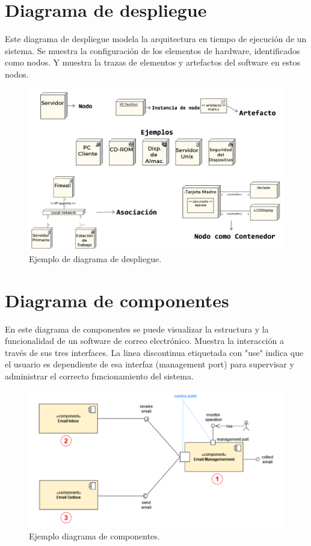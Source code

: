 \documentclass[a4paper, 12pt]{book}
\begin{document}
\section{Diagrama de despliegue}
Este diagrama de despliegue modela la arquitectura en tiempo de ejecución de un sistema. Se muestra la configuración de los elementos de hardware, identificados como nodos. Y muestra la trazas de elementos y artefactos del software en estos nodos. 
\begin{figure}
	\centering
	\includegraphics[width=16cm, keepaspectratio]{img/diagrama_despliegue.png}
	\caption{Ejemplo de diagrama de despliegue.}\label{fig:diagrama_despliegue}
\end{figure}

\section{Diagrama de componentes}
En este diagrama de componentes se puede visualizar la estructura y la funcionalidad de un software de correo electrónico. Muestra la interacción a través de sus tres interfaces. La linea discontinua etiquetada con "use" indica que el usuario es dependiente de esa interfaz (management port) para supervisar y administrar el correcto funcionamiento del sistema.
\begin{figure}
	\centering
	\includegraphics[width=18cm, keepaspectratio]{img/diagrama_componentes.png}
	\caption{Ejemplo diagrama de componentes.}\label{fig:diagrama_componentes}
\end{figure}
\end{document}
